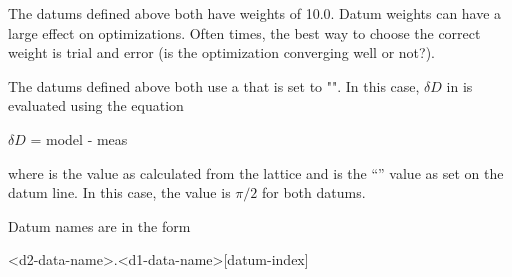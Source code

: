 \documentclass{hitec}     %
\begin{document}
The datums defined above both have weights of 10.0. Datum weights can have a large effect on optimizations. Often times, the best
way to choose the correct weight is trial and error (is the optimization converging well or not?). 

The datums defined above both use a  that is set to "". 
In this case, $\delta D$ in  is evaluated using the equation
\begin{code}[mathescape]
$\delta D$ = model - meas
\end{code}
where  is the value as calculated from the lattice and  is the
``'' value as set on the datum line.
In this case, the  value is $\pi/2$ for both datums.

Datum names are in the form
\begin{code}
<d2-data-name>.<d1-data-name>[datum-index]
\end{code}
\end{document}
